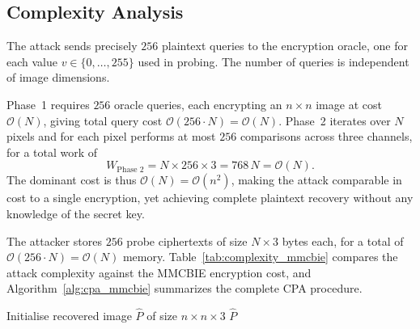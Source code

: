 \subsection{Complexity Analysis}
\label{subsec:complexity_mmcbie}

The attack sends precisely $256$ plaintext queries to the encryption oracle,
one for each value $v \in \{0,\ldots,255\}$ used in probing. The number of
queries is independent of image dimensions.

Phase~1 requires $256$ oracle queries, each encrypting an $n \times n$ image
at cost $\mathcal{O}(N)$, giving total query cost $\mathcal{O}(256 \cdot N) =
\mathcal{O}(N)$. Phase~2 iterates over $N$ pixels and for each pixel performs
at most $256$ comparisons across three channels, for a total work of
\begin{equation}
  W_{\text{Phase 2}} = N \times 256 \times 3 = 768\,N = \mathcal{O}(N).
  \label{eq:work_phase2}
\end{equation}
The dominant cost is thus $\mathcal{O}(N) = \mathcal{O}(n^2)$, making the
attack comparable in cost to a single encryption, yet achieving complete
plaintext recovery without any knowledge of the secret key.

The attacker stores $256$ probe ciphertexts of size $N \times 3$ bytes each,
for a total of $\mathcal{O}(256 \cdot N) = \mathcal{O}(N)$ memory.
Table~\ref{tab:complexity_mmcbie} compares the attack complexity against the MMCBIE encryption cost, and Algorithm~\ref{alg:cpa_mmcbie} summarizes the complete CPA procedure.


\begin{algorithm}[t]
\LinesNumbered
\caption{CPA Against MMCBIE}
\label{alg:cpa_mmcbie}
\SetAlgoLined
{}
\BlankLine

\BlankLine

Initialise recovered image $\hat{P}$ of size $n \times n \times 3$\;
\BlankLine
\Return $\hat{P}$\;
\end{algorithm}





